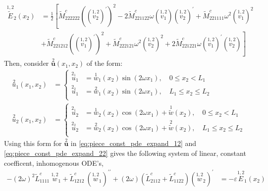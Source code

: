 \documentclass[11pt]{report}
\begin{document}
\begin{appendices}
\begin{align*}
\overset{{1,2}}{\widetilde{E}}_2(x_2) &= \frac{1}{2} \left [ \tilde{M}^c_{222222} \left(\left (\overset{{1,2}}{v_2} \right)^\prime \right)^2 - 2 \tilde{M}^c_{221122} \omega \left(\overset{{1,2}}{v_1} \right) \left(\overset{{1,2}}{v_2} \right)^\prime + \tilde{M}^c_{221111} \omega^2 \left(\overset{{1,2}}{v_1} \right)^2 \right. \\
&+ \left. \tilde{M}^c_{221212} \left(\left (\overset{{1,2}}{v_1} \right)^\prime \right)^2 + \tilde{M}^c_{222121} \omega^2 \left(\overset{{1,2}}{v_2} \right)^2 + 2 \tilde{M}^c_{221221} \omega \left(\overset{{1,2}}{v_1} \right)^\prime \left(\overset{{1,2}}{v_2} \right) \right ]
\end{align*}
Then, consider $\overset{2}{\mathbf{u}}(x_1, x_2)$ of the form:
\begin{equation} \label{eq:piece_const_u2_form}
\begin{aligned}
\overset{2}{u}_1(x_1, x_2) &= \left \{
\begin{aligned}
  \overset{2_1}{u}_1 &= \overset{1}{w}_1(x_2) \sin(2 \omega x_1), \quad  0 \leq x_2 < L_1\\
  \overset{2_2}{u}_1 &= \overset{2}{w}_1(x_2) \sin(2 \omega x_1), \quad  L_1 \leq x_2 \leq L_2 \\
\end{aligned}
\right.
\\
\overset{2}{u}_2(x_1, x_2) &= \left \{
\begin{aligned}
  \overset{2_1}{u}_2 &= \overset{1}{w}_2(x_2) \cos(2 \omega x_1) + \overset{1}{\widetilde{w}}(x_2), \quad  0 \leq x_2 < L_1\\
\overset{2_2}{u}_2 &= \overset{2}{w}_2(x_2) \cos(2 \omega x_1) + \overset{2}{\widetilde{w}}(x_2), \quad  L_1 \leq x_2 \leq L_2\\
\end{aligned}
\right.
\end{aligned}
\end{equation}
Using this form for $\overset{2}{\mathbf{u}}$ in \eqref{eq:piece_const_pde_expand_12} and \eqref{eq:piece_const_pde_expand_22} gives the following system of linear, constant coefficent, inhomogenous ODE's,
\begin{equation} \label{eq:piece_const_w_2_system}
\begin{aligned}
- (2 \omega)^2 \tilde{L}^{c}_{1111} \: \overset{1,2}{w}_1 + \tilde{L}^{c}_{1212} \: \left(\overset{1,2}{w}_1 \right)^{\prime \prime} + (2 \omega) (\tilde{L}^{c}_{2112} + \tilde{L}^{c}_{1122}) \left(\overset{1,2}{w}_2 \right)^\prime &= - \varepsilon \overset{1,2}{E}_1(x_2) \\ 

\end{aligned}
\end{equation}
\end{appendices}
\end{document}

